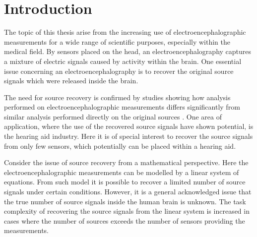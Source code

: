 \chapter*{Introduction}\label{ch:introduction}
%
%
The topic of this thesis arise from the increasing use of electroencephalographic measurements for a wide range of scientific purposes, especially within the medical field. 
By sensors placed on the head, an electroencephalography captures a mixture of electric signals caused by activity within the brain.   
One essential issue concerning an electroencephalography is to  
recover the original source signals which were released inside the brain. 
 
The need for source recovery is confirmed by studies showing how analysis performed on electroencephalographic measurements differs significantly from similar analysis performed directly on the original sources \cite{Friston2002}.
One area of application, where the use of the recovered source signals have shown potential, is the hearing aid industry. Here it is of special interest to recover the source signals from only few sensors, which potentially can be placed within a hearing aid.     

Consider the issue of source recovery from a mathematical perspective. Here the electroencephalographic measurements can be modelled by a linear system of equations. From such model it is possible to recover a limited number of source signals under certain conditions. However, it is a general acknowledged issue that the true number of source signals inside the human brain is unknown.
The task complexity of recovering the source signals from the linear system is increased in cases where the number of sources exceeds the number of sensors providing the measurements.

